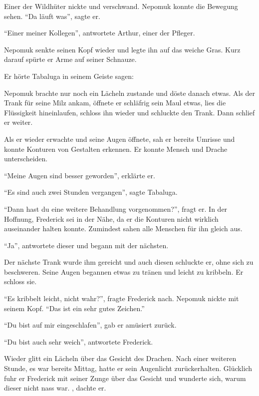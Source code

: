 Einer der Wildhüter nickte und verschwand. Nepomuk konnte die Bewegung sehen. \enquote{Da läuft was}, sagte er.

\enquote{Einer meiner Kollegen}, antwortete Arthur, einer der Pfleger.

Nepomuk senkte seinen Kopf wieder und legte ihn auf das weiche Gras. Kurz darauf spürte er Arme auf seiner Schnauze.

Er hörte Tabaluga in seinem Geiste sagen: 

Nepomuk brachte nur noch ein Lächeln zustande und döste danach etwas. Als der Trank für seine Milz ankam, öffnete er schläfrig sein Maul etwas, lies die Flüssigkeit hineinlaufen, schloss ihn wieder und schluckte den Trank. Dann schlief er weiter.

Als er wieder erwachte und seine Augen öffnete, sah er bereits Umrisse und konnte Konturen von Gestalten erkennen. Er konnte Mensch und Drache unterscheiden.

\enquote{Meine Augen sind besser geworden}, erklärte er.

\enquote{Es sind auch zwei Stunden vergangen}, sagte Tabaluga.

\enquote{Dann hast du eine weitere Behandlung vorgenommen?}, fragt er. In der Hoffnung, Frederick sei in der Nähe, da er die Konturen nicht wirklich auseinander halten konnte. Zumindest sahen alle Menschen für ihn gleich aus.

\enquote{Ja}, antwortete dieser und begann mit der nächsten.

Der nächste Trank wurde ihm gereicht und auch diesen schluckte er, ohne sich zu beschweren. Seine Augen begannen etwas zu tränen und leicht zu kribbeln. Er schloss sie.

\enquote{Es kribbelt leicht, nicht wahr?}, fragte Frederick nach. Nepomuk nickte mit seinem Kopf. \enquote{Das ist ein sehr gutes Zeichen.}

\enquote{Du bist auf mir eingeschlafen}, gab er amüsiert zurück.

\enquote{Du bist auch sehr weich}, antwortete Frederick.

Wieder glitt ein Lächeln über das Gesicht des Drachen. Nach einer weiteren Stunde, es war bereits Mittag, hatte er sein Augenlicht zurückerhalten. Glücklich fuhr er Frederick mit seiner Zunge über das Gesicht und wunderte sich, warum dieser nicht nass war. , dachte er. 

